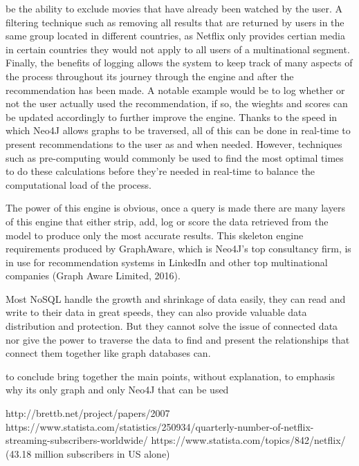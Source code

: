 \documentclass[a4paper]{article}
\begin{document}
be the ability to exclude movies that have already been watched by the user. A filtering technique such as removing all results that are returned by users in the same group located in different countries, as Netflix only provides certian media in certain countries they would not apply to all users of a multinational segment. Finally, the benefits of logging allows the system to keep track of many aspects of the process throughout its journey through the engine and after the recommendation has been made. A notable example would be to log whether or not the user actually used the recommendation, if so, the wieghts and scores can be updated accordingly to further improve the engine. Thanks to the speed in which Neo4J allows graphs to be traversed, all of this can be done in real-time to present recommendations to the user as and when needed. However, techniques such as pre-computing would commonly be used to find the most optimal times to do these calculations before they're needed in real-time to balance the computational load of the process.

The power of this engine is obvious, once a query is made there are many layers of this engine that either strip, add, log or score the data retrieved from the model to produce only the most accurate results. This skeleton engine requirements produced by GraphAware, which is Neo4J's top consultancy firm, is in use for recommendation systems in LinkedIn and other top multinational companies (Graph Aware Limited, 2016).


Most NoSQL handle the growth and shrinkage of data easily, they can read and write to their data in great speeds, they can also provide valuable data distribution and protection. But they cannot solve the issue of connected data nor give the power to traverse the data to find and present the relationships that connect them together like graph databases can. \par
to conclude bring together the main points, without explanation, to emphasis why its only graph and only Neo4J that can be used


http://brettb.net/project/papers/2007%
https://www.statista.com/statistics/250934/quarterly-number-of-netflix-streaming-subscribers-worldwide/
https://www.statista.com/topics/842/netflix/ (43.18 million subscribers in US alone)
\end{document}
